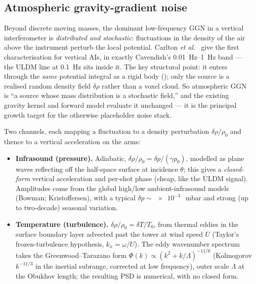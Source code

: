 \documentclass[11pt,a4paper]{article}
\theoremstyle{reqstyle}
\begin{document}
\subsection{Atmospheric gravity-gradient noise}
\label{sec:atmo}
Beyond discrete moving masses, the dominant low-frequency GGN in a vertical interferometer is
\emph{distributed and stochastic}: fluctuations in the density of the air above the instrument
perturb the local potential. Carlton \emph{et al.}~\cite{carlton2025} give the first
characterisation for vertical AIs, in exactly Cavendish's \SIrange{0.01}{1}{\hertz} band --- the
ULDM line at \SI{0.1}{\hertz} sits inside it. The key structural point: it enters through the
\emph{same} potential integral as a rigid body (); only the source
is a realised random density field $\delta\rho$ rather than a voxel cloud. So atmospheric GGN
is ``a source whose mass distribution is a stochastic field,'' and the existing gravity kernel
and forward model evaluate it unchanged --- it is the principal growth target for the otherwise
placeholder noise stack.

Two channels, each mapping a fluctuation to a density perturbation $\delta\rho/\rho_0$ and
thence to a vertical acceleration on the arms:
\begin{itemize}[leftmargin=*,nosep]
\item \textbf{Infrasound (pressure).} Adiabatic, $\delta\rho/\rho_0 = \delta p/(\gamma p_0)$,
modelled as plane waves reflecting off the half-space surface at incidence $\theta$; this gives
a \emph{closed-form} vertical acceleration and per-shot phase (cheap, like the ULDM signal).
Amplitudes come from the global high/low ambient-infrasound models (Bowman; Kristoffersen),
with a typical $\delta p\sim\SI{e-3}{}$~mbar and strong (up to two-decade) seasonal variation.
\item \textbf{Temperature (turbulence).} $\delta\rho/\rho_0 = \delta T/T_0$, from thermal eddies
in the surface boundary layer advected past the tower at wind speed $U$ (Taylor's
frozen-turbulence hypothesis, $k_x = \omega/U$). The eddy wavenumber spectrum takes the
Greenwood--Tarazano form $\Phi(k)\propto (k^2 + k/\Lambda)^{-11/6}$ (Kolmogorov $k^{-11/3}$ in
the inertial subrange, corrected at low frequency), outer scale $\Lambda$ at the Obukhov length;
the resulting PSD is numerical, with no closed form.
\end{itemize}
\end{document}
